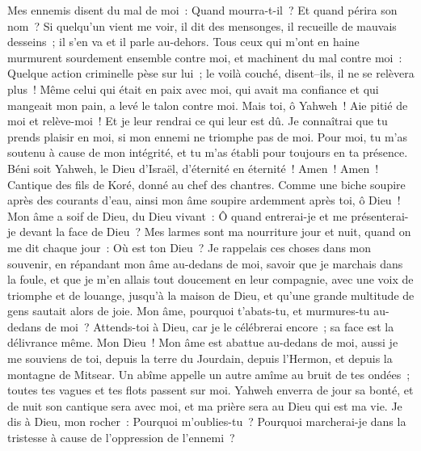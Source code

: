 \begin{multicols}{2}
Mes ennemis disent du mal de moi~: Quand mourra-t-il~? Et quand périra son nom~?
Si quelqu'un vient me voir, il dit des mensonges, il recueille de mauvais desseins~; il s'en va et il parle au-dehors.
Tous ceux qui m'ont en haine murmurent sourdement ensemble contre moi, et machinent du mal contre moi~:
Quelque action criminelle pèse sur lui~; le voilà couché, disent–ils, il ne se relèvera plus~!
Même celui qui était en paix avec moi, qui avait ma confiance et qui mangeait mon pain, a levé le talon contre moi.
Mais toi, ô Yahweh~! Aie pitié de moi et relève-moi~! Et je leur rendrai ce qui leur est dû.
Je connaîtrai que tu prends plaisir en moi, si mon ennemi ne triomphe pas de moi.
Pour moi, tu m'as soutenu à cause de mon intégrité, et tu m'as établi pour toujours en ta présence.
Béni soit Yahweh, le Dieu d'Israël, d'éternité en éternité~! Amen~! Amen~!
\VerseOne{}Cantique des fils de Koré, donné au chef des chantres.
Comme une biche soupire après des courants d'eau, ainsi mon âme soupire ardemment après toi, ô Dieu~!
Mon âme a soif de Dieu, du Dieu vivant~: Ô quand entrerai-je et me présenterai-je devant la face de Dieu~?
Mes larmes sont ma nourriture jour et nuit, quand on me dit chaque jour~: Où est ton Dieu~?
Je rappelais ces choses dans mon souvenir, en répandant mon âme au-dedans de moi, savoir que je marchais dans la foule, et que je m'en allais tout doucement en leur compagnie, avec une voix de triomphe et de louange, jusqu'à la maison de Dieu, et qu'une grande multitude de gens sautait alors de joie.
Mon âme, pourquoi t'abats-tu, et murmures-tu au-dedans de moi~? Attends-toi à Dieu, car je le célébrerai encore~; sa face est la délivrance même.
Mon Dieu~! Mon âme est abattue au-dedans de moi, aussi je me souviens de toi, depuis la terre du Jourdain, depuis l'Hermon, et depuis la montagne de Mitsear.
Un abîme appelle un autre amîme au bruit de tes ondées~; toutes tes vagues et tes flots passent sur moi.
Yahweh enverra de jour sa bonté, et de nuit son cantique sera avec moi, et ma prière sera au Dieu qui est ma vie.
Je dis à Dieu, mon rocher~: Pourquoi m'oublies-tu~? Pourquoi marcherai-je dans la tristesse à cause de l'oppression de l'ennemi~?

\end{multicols}
